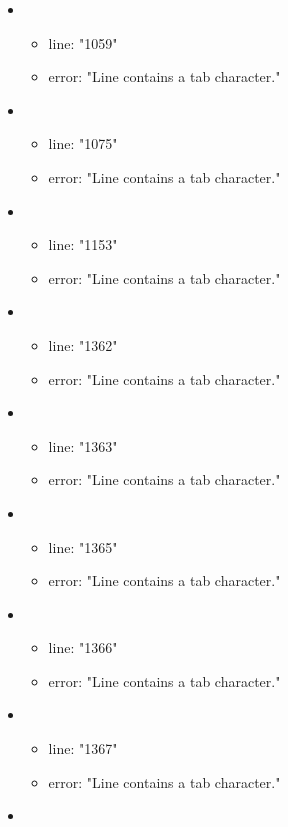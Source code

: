 \begin{itemize}
	\item 
	\begin{itemize} 
		\item line: "1059" 
		\item error: "Line contains a tab character." 
	\end{itemize}
	\item 
	\begin{itemize} 
		\item line: "1075" 
		\item error: "Line contains a tab character." 
	\end{itemize}
	\item 
	\begin{itemize} 
		\item line: "1153" 
		\item error: "Line contains a tab character." 
	\end{itemize}
	\item 
	\begin{itemize} 
		\item line: "1362" 
		\item error: "Line contains a tab character." 
	\end{itemize}
	\item 
	\begin{itemize} 
		\item line: "1363" 
		\item error: "Line contains a tab character." 
	\end{itemize}
	\item 
	\begin{itemize} 
		\item line: "1365" 
		\item error: "Line contains a tab character." 
	\end{itemize}
	\item 
	\begin{itemize} 
		\item line: "1366" 
		\item error: "Line contains a tab character." 
	\end{itemize}
	\item 
	\begin{itemize} 
		\item line: "1367" 
		\item error: "Line contains a tab character." 
	\end{itemize}
	\item 
	\begin{itemize} 

\end{itemize}
\end{itemize}
